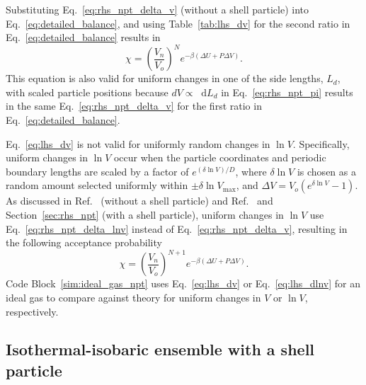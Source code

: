 \documentclass[
  9pt,
  bestpractices,
  pubversion,
]{livecoms}
\newcommand*\diff{\mathop{}\!\mathrm{d}}
\begin{document}
Substituting Eq.~\ref{eq:rhs_npt_delta_v} (without a shell particle) into Eq.~\ref{eq:detailed_balance}, and using Table~\ref{tab:lhs_dv} for the second ratio in Eq.~\ref{eq:detailed_balance} results in
\begin{equation}
\chi=\left(\frac{V_n}{V_o}\right)^{N}e^{-\beta(\Delta U + P\Delta V)}.
\label{eq:lhs_dv}
\end{equation}
This equation is also valid for uniform changes in one of the side lengths, $L_d$, with scaled particle positions because $dV \propto \diff L_d$ in Eq.~\ref{eq:rhs_npt_pi} results in the same Eq.~\ref{eq:rhs_npt_delta_v} for the first ratio in Eq.~\ref{eq:detailed_balance}.

Eq.~\ref{eq:lhs_dv} is not valid for uniformly random changes in $\ln V$.
Specifically, uniform changes in $\ln V$ occur when the particle coordinates and periodic boundary lengths are scaled by a factor of $e^{(\delta\ln V)/D}$, where $\delta\ln V$ is chosen as a random amount selected uniformly within $\pm\delta\ln V_{\mathrm{max}}$, and $\Delta V = V_o(e^{\delta\ln V}-1)$.
As discussed in Ref.~\cite{frenkel_understanding_2002} (without a shell particle) and Ref.~\cite{corti_monte_2002} and Section~\ref{sec:rhs_npt} (with a shell particle), uniform changes in $\ln V$ use Eq.~\ref{eq:rhs_npt_delta_lnv} instead of Eq.~\ref{eq:rhs_npt_delta_v}, resulting in the following acceptance probability
\begin{equation}
\chi=\left(\frac{V_n}{V_o}\right)^{N+1}e^{-\beta(\Delta U + P\Delta V)}.
\label{eq:lhs_dlnv}
\end{equation}
Code Block~\ref{sim:ideal_gas_npt} uses Eq.~\ref{eq:lhs_dv} or Eq.~\ref{eq:lhs_dlnv} for an ideal gas to compare against theory for uniform changes in $V$ or $\ln V$, respectively.

\begin{figure}

\end{figure}

\subsection{\label{sec:rhs_npt_no_shell}Isothermal-isobaric ensemble with a shell particle}
\end{document}
